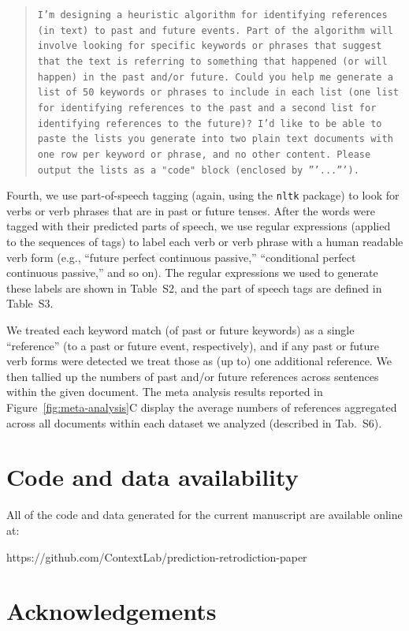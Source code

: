 \documentclass[10pt]{article}
\newcommand{\regExpTable}{S2}
\newcommand{\posTags}{S3}
\newcommand{\metaAnalysisDatasets}{S6}
\begin{document}
\begin{quote}
\texttt{I'm designing a heuristic algorithm for identifying references (in text) to past and future events. Part of the algorithm will involve looking for specific keywords or phrases that suggest that the text is referring to something that happened (or will happen) in the past and/or future. Could you help me generate a list of 50 keywords or phrases to include in each list (one list for identifying references to the past and a second list for identifying references to the future)? I'd like to be able to paste the lists you generate into two plain text documents with one row per keyword or phrase, and no other content. Please output the lists as a "code" block (enclosed by '''...''').}
\end{quote}
Fourth, we use part-of-speech tagging (again, using the \texttt{nltk} package) to look for verbs or verb phrases that are in past or future tenses.  After the words were tagged with their predicted parts of speech, we use regular expressions (applied to the sequences of tags) to label each verb or verb phrase with a human readable verb form (e.g., ``future perfect continuous passive,'' ``conditional perfect continuous passive,'' and so on).  The regular expressions we used to generate these labels are shown in Table~\regExpTable, and the part of speech tags are defined in Table~\posTags.

We treated each keyword match (of past or future keywords) as a single ``reference'' (to a past or future event, respectively), and if any past or future verb forms were detected we treat those as (up to) one additional reference. We then tallied up the numbers of past and/or future references across sentences within the given document. The meta analysis results reported in Figure~\ref{fig:meta-analysis}C display the average numbers of references aggregated across all documents within each dataset we analyzed (described in Tab.~\metaAnalysisDatasets).

\section*{Code and data availability}

All of the code and data generated for the current manuscript are available online at:

https://github.com/ContextLab/prediction-retrodiction-paper

% 


\section*{Acknowledgements}
\end{document}
